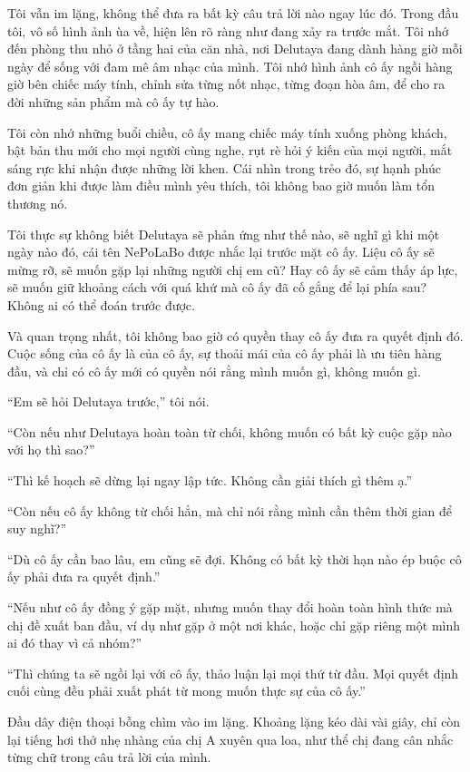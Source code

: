 \documentclass[../main.tex]{subfiles}
\begin{document}
Tôi vẫn im lặng, không thể đưa ra bất kỳ câu trả lời nào ngay lúc đó. Trong đầu tôi, vô số hình ảnh ùa về, hiện lên rõ ràng như đang xảy ra trước mắt. Tôi nhớ đến phòng thu nhỏ ở tầng hai của căn nhà, nơi Delutaya đang dành hàng giờ mỗi ngày để sống với đam mê âm nhạc của mình. Tôi nhớ hình ảnh cô ấy ngồi hàng giờ bên chiếc máy tính, chỉnh sửa từng nốt nhạc, từng đoạn hòa âm, để cho ra đời những sản phẩm mà cô ấy tự hào.

Tôi còn nhớ những buổi chiều, cô ấy mang chiếc máy tính xuống phòng khách, bật bản thu mới cho mọi người cùng nghe, rụt rè hỏi ý kiến của mọi người, mắt sáng rực khi nhận được những lời khen. Cái nhìn trong trẻo đó, sự hạnh phúc đơn giản khi được làm điều mình yêu thích, tôi không bao giờ muốn làm tổn thương nó.

Tôi thực sự không biết Delutaya sẽ phản ứng như thế nào, sẽ nghĩ gì khi một ngày nào đó, cái tên NePoLaBo được nhắc lại trước mặt cô ấy. Liệu cô ấy sẽ mừng rỡ, sẽ muốn gặp lại những người chị em cũ? Hay cô ấy sẽ cảm thấy áp lực, sẽ muốn giữ khoảng cách với quá khứ mà cô ấy đã cố gắng để lại phía sau? Không ai có thể đoán trước được.

Và quan trọng nhất, tôi không bao giờ có quyền thay cô ấy đưa ra quyết định đó. Cuộc sống của cô ấy là của cô ấy, sự thoải mái của cô ấy phải là ưu tiên hàng đầu, và chỉ có cô ấy mới có quyền nói rằng mình muốn gì, không muốn gì.

``Em sẽ hỏi Delutaya trước,'' tôi nói.

``Còn nếu như Delutaya hoàn toàn từ chối, không muốn có bất kỳ cuộc gặp nào với họ thì sao?''

``Thì kế hoạch sẽ dừng lại ngay lập tức. Không cần giải thích gì thêm ạ.''

``Còn nếu cô ấy không từ chối hẳn, mà chỉ nói rằng mình cần thêm thời gian để suy nghĩ?''

``Dù cô ấy cần bao lâu, em cũng sẽ đợi. Không có bất kỳ thời hạn nào ép buộc cô ấy phải đưa ra quyết định.''

``Nếu như cô ấy đồng ý gặp mặt, nhưng muốn thay đổi hoàn toàn hình thức mà chị đề xuất ban đầu, ví dụ như gặp ở một nơi khác, hoặc chỉ gặp riêng một mình ai đó thay vì cả nhóm?''

``Thì chúng ta sẽ ngồi lại với cô ấy, thảo luận lại mọi thứ từ đầu. Mọi quyết định cuối cùng đều phải xuất phát từ mong muốn thực sự của cô ấy.''

Đầu dây điện thoại bỗng chìm vào im lặng. Khoảng lặng kéo dài vài giây, chỉ còn lại tiếng hơi thở nhẹ nhàng của chị A xuyên qua loa, như thể chị đang cân nhắc từng chữ trong câu trả lời của mình.
\end{document}
